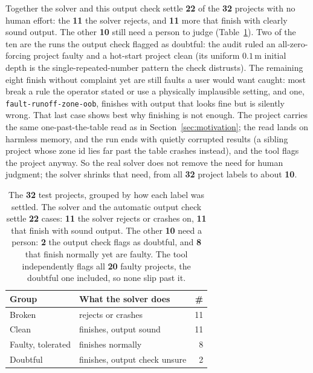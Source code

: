 \documentclass[conference]{IEEEtran}
\begin{document}
Together the solver and this output check settle \textbf{22} of the \textbf{32} projects with no
human effort: the \textbf{11} the solver rejects, and \textbf{11} more that finish with clearly
sound output. The other \textbf{10} still need a person to judge (Table~\ref{tab:oracle}). Two of
the ten are the runs the output check flagged as doubtful: the audit ruled an all-zero-forcing
project faulty and a hot-start project clean (its uniform $0.1$\,m initial depth is
the single-repeated-number pattern the check distrusts). The remaining eight finish without
complaint yet are still faults a user would want caught: most break a rule the operator stated or
use a physically implausible setting, and one, \texttt{fault-runoff-zone-oob}, finishes with
output that looks fine but is silently wrong. That last case shows best why finishing is not
enough. The project carries the same one-past-the-table read as in Section~\ref{sec:motivation};
the read lands on harmless memory, and the run ends with quietly corrupted results (a sibling
project whose zone id lies far past the table crashes instead), and the tool flags the project
anyway. So the real solver does not remove the need for human judgment; the solver shrinks that
need, from all \textbf{32} project labels to about \textbf{10}.

\begin{table}[!t]
\caption{The \textbf{32} test projects, grouped by how each label was settled. The solver and the
automatic output check settle \textbf{22} cases: \textbf{11} the solver rejects or crashes on,
\textbf{11} that finish with sound output. The other \textbf{10} need a person: \textbf{2} the
output check flags as doubtful, and \textbf{8} that finish normally yet are faulty. The tool
independently flags all \textbf{20} faulty projects, the doubtful one included, so none slip
past it.}
\label{tab:oracle}
\centering
\footnotesize
\begin{tabular}{@{}llr@{}}
\toprule
\textbf{Group} & \textbf{What the solver does} & \textbf{\#} \\
\midrule
Broken            & rejects or crashes            & 11 \\
Clean             & finishes, output sound        & 11 \\
Faulty, tolerated & finishes normally             & 8 \\
Doubtful          & finishes, output check unsure & 2 \\
\bottomrule
\end{tabular}
\end{table}
\end{document}
